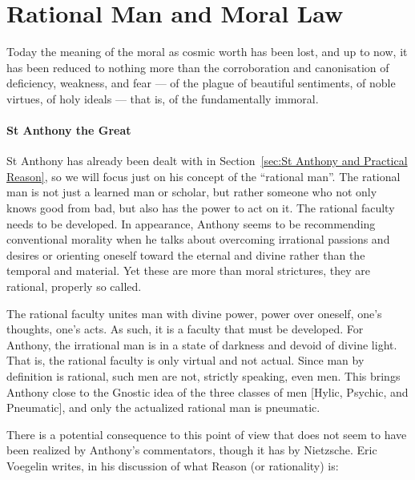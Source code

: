 \section{Rational Man and Moral Law}

\label{sec:RationalMalMoralLaw}

\begin{quotex}
Today the meaning of the moral as cosmic worth has been lost, and up to now, it has been reduced to nothing more than the corroboration and canonisation of deficiency, weakness, and fear — of the plague of beautiful sentiments, of noble virtues, of holy ideals — that is, of the fundamentally immoral. 

\end{quotex}
\paragraph{St Anthony the Great}
St Anthony has already been dealt with in Section~\ref{sec:St Anthony and Practical Reason}, so we will focus just on his concept of the “rational man”. The rational man is not just a learned man or scholar, but rather someone who not only knows good from bad, but also has the power to act on it. The rational faculty needs to be developed. In appearance, Anthony seems to be recommending conventional morality when he talks about overcoming irrational passions and desires or orienting oneself toward the eternal and divine rather than the temporal and material. Yet these are more than moral strictures, they are rational, properly so called.

The rational faculty unites man with divine power, power over oneself, one's thoughts, one's acts. As such, it is a faculty that must be developed. For Anthony, the irrational man is in a state of darkness and devoid of divine light. That is, the rational faculty is only virtual and not actual. Since man by definition is rational, such men are not, strictly speaking, even men. This brings Anthony close to the Gnostic idea of the three classes of men [Hylic, Psychic, and Pneumatic], and only the actualized rational man is pneumatic. 

There is a potential consequence to this point of view that does not seem to have been realized by Anthony's commentators, though it has by Nietzsche. Eric Voegelin writes, in his discussion of what Reason (or rationality) is:

